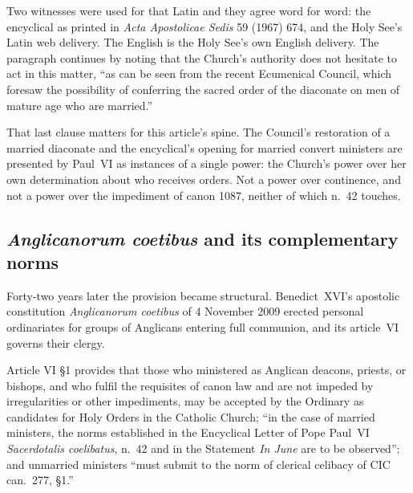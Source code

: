 Two witnesses were used for that Latin and they agree word for word: the encyclical as printed in \emph{Acta Apostolicae Sedis} 59 (1967) 674, and the Holy See's Latin web delivery. The English is the Holy See's own English delivery. The paragraph continues by noting that the Church's authority does not hesitate to act in this matter, ``as can be seen from the recent Ecumenical Council, which foresaw the possibility of conferring the sacred order of the diaconate on men of mature age who are married.''

That last clause matters for this article's spine. The Council's restoration of a married diaconate and the encyclical's opening for married convert ministers are presented by Paul~VI as instances of a single power: the Church's power over her own determination about who receives orders. Not a power over continence, and not a power over the impediment of canon 1087, neither of which n.~42 touches.

\subsection{\emph{Anglicanorum coetibus} and its complementary norms}

Forty-two years later the provision became structural. Benedict~XVI's apostolic constitution \emph{Anglicanorum coetibus} of 4 November 2009 erected personal ordinariates for groups of Anglicans entering full communion, and its article~VI governs their clergy.

Article VI §1 provides that those who ministered as Anglican deacons, priests, or bishops, and who fulfil the requisites of canon law and are not impeded by irregularities or other impediments, may be accepted by the Ordinary as candidates for Holy Orders in the Catholic Church; ``in the case of married ministers, the norms established in the Encyclical Letter of Pope Paul~VI \emph{Sacerdotalis coelibatus}, n.~42 and in the Statement \emph{In June} are to be observed''; and unmarried ministers ``must submit to the norm of clerical celibacy of CIC can.~277, §1.''

